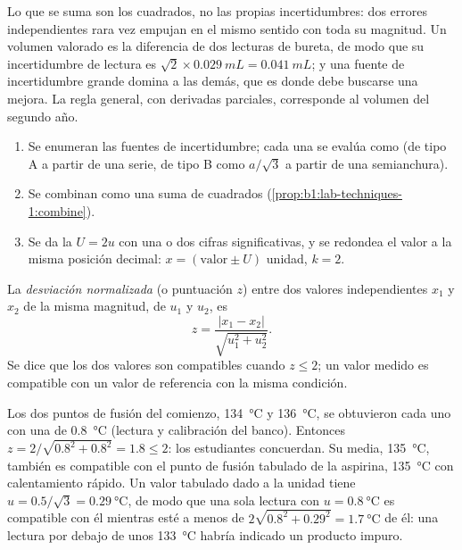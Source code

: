 Lo que se suma son los cuadrados, no las propias incertidumbres: dos
errores independientes rara vez empujan en el mismo sentido con toda su
magnitud. Un volumen valorado es la diferencia de dos lecturas de bureta,
de modo que su incertidumbre de lectura es
$\sqrt2 \times \qty{0.029}{mL} = \qty{0.041}{mL}$; y una fuente de
incertidumbre grande domina a las demás, que es donde debe buscarse una
mejora. La regla general, con derivadas parciales, corresponde al volumen
del segundo año.

\begin{method}\label{met:b1:lab-techniques-1:report-result}
\begin{enumerate}
  \item Se enumeran las fuentes de incertidumbre; cada una se evalúa como
         (de tipo A a partir de una serie, de tipo B
        como $a/\sqrt3$ a partir de una semianchura).
  \item Se combinan como una suma de cuadrados
        (\cref{prop:b1:lab-techniques-1:combine}).
  \item Se da la  $U = 2u$ con una o dos cifras
        significativas, y se redondea el valor a la misma posición
        decimal: $x = (\text{valor} \pm U)$ unidad, $k = 2$.
\end{enumerate}
\end{method}

\begin{definition}\label{def:b1:lab-techniques-1:z-score}
La \emph{desviación normalizada} (o puntuación $z$)
entre dos valores independientes $x_1$ y $x_2$ de la misma magnitud, de
 $u_1$ y $u_2$, es
\[
  z = \frac{|x_1 - x_2|}{\sqrt{u_1^2 + u_2^2}} .
\]
Se dice que los dos valores son compatibles cuando $z \le 2$; un valor
medido es compatible con un valor de referencia con la misma condición.
\end{definition}

\begin{example}
Los dos puntos de fusión del comienzo, \qty{134}{\celsius} y
\qty{136}{\celsius}, se obtuvieron cada uno con una 
de \qty{0.8}{\celsius} (lectura y calibración del banco). Entonces
$z = 2/\sqrt{0.8^2 + 0.8^2} = 1.8 \le 2$: los estudiantes concuerdan. Su
media, \qty{135}{\celsius}, también es compatible con el punto de fusión
tabulado de la aspirina, \qty{135}{\celsius} con calentamiento rápido. Un
valor tabulado dado a la unidad tiene $u = 0.5/\sqrt3 = \qty{0.29}{\celsius}$,
de modo que una sola lectura con $u = \qty{0.8}{\celsius}$ es compatible
con él mientras esté a menos de
$2\sqrt{0.8^2 + 0.29^2} = \qty{1.7}{\celsius}$ de él: una lectura por
debajo de unos \qty{133}{\celsius} habría indicado un producto impuro.
\end{example}

